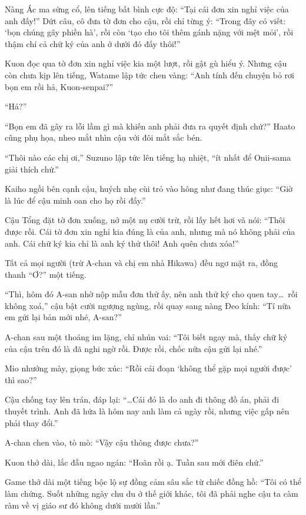 \documentclass[../main.tex]{subfiles}
\begin{document}
Nàng Ác ma sừng cổ, lên tiếng bất bình cực độ: ``Tại cái đơn xin nghỉ việc của anh đấy!'' Dứt câu, cô đưa tờ đơn cho cậu, rồi chỉ từng ý: ``Trong đây có viết: `bọn chúng gây phiền hà', rồi còn `tạo cho tôi thêm gánh nặng với mệt mỏi', rồi thậm chí cả chữ ký của anh ở dưới đó đấy thôi!''

Kuon đọc qua tờ đơn xin nghỉ việc kia một lượt, rồi gật gù hiểu ý. Nhưng cậu còn chưa kịp lên tiếng, Watame lập tức chen vàng: ``Anh tính đến chuyện bỏ rơi bọn em rồi hả, Kuon-senpai?''

``Hả?''

``Bọn em đã gây ra lỗi lầm gì mà khiến anh phải đưa ra quyết định chứ?'' Haato cũng phụ họa, nheo mắt nhìn cậu với đôi mắt sắc bén.

``Thôi nào các chị ơi,'' Suzuno lập tức lên tiếng hạ nhiệt, ``ít nhất để Onii-sama giải thích chứ.''

Kaiho ngồi bên cạnh cậu, huých nhẹ cùi trỏ vào hông như đang thúc giục: ``Giờ là lúc để cậu minh oan cho họ rồi đấy.''

Cậu Tổng đặt tờ đơn xuống, nở một nụ cười trừ, rồi lấy hết hơi và nói: ``Thôi được rồi. Cái tờ đơn xin nghỉ kia đúng là của anh, nhưng mà nó không phải của anh. Cái chữ ký kia chỉ là anh ký thử thôi! Anh quên chưa xóa!''

Tất cả mọi người (trừ A-chan và chị em nhà Hikawa) đều ngơ mặt ra, đồng thanh ``Ơ?'' một tiếng.

``Thì, hôm đó A-san nhờ nộp mẫu đơn thử ấy, nên anh thử ký cho quen tay\dots\ rồi không xoá,'' cậu bật cười ngượng ngùng, rồi quay sang nàng Đeo kính: ``Tí nữa em gửi lại bản mới nhé, A-san?''

A-chan sau một thoáng im lặng, chỉ nhún vai: ``Tôi biết ngay mà, thấy chữ ký của cậu trên đó là đã nghi ngờ rồi. Được rồi, chốc nữa cậu gửi lại nhé.''

Mio nhướng mày, giọng bức xúc: ``Rồi cái đoạn `không thể gặp mọi người được' thì sao?''

Cậu chống tay lên trán, đáp lại: ``\dots Cái đó là do anh đi thông đồ án, phải đi thuyết trình. Anh đã hứa là hôm nay anh làm cả ngày rồi, nhưng việc gấp nên phải thay đổi.''

A-chan chen vào, tò mò: ``Vậy cậu thông được chưa?''

Kuon thở dài, lắc đầu ngao ngán: ``Hoãn rồi ạ. Tuần sau mới điên chứ.''

Game thở dài một tiếng bộc lộ sự đồng cảm sâu sắc từ chiếc đồng hồ: ``Tôi có thể làm chứng. Suốt những ngày chu du ở thế giới khác, tôi đã phải nghe cậu ta càm ràm về vị giáo sư đó không dưới mười lần.''
\end{document}

